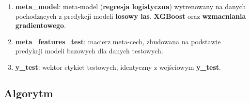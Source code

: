 \begin{enumerate}
	\def\labelenumi{\arabic{enumi}.}
	\item
	      \textbf{meta\_model}: meta-model (\textbf{regresja logistyczna}) wytrenowany na danych pochodzących z predykcji modeli \textbf{losowy las}, \textbf{XGBoost} oraz \textbf{wzmacniania gradientowego}.
	\item
	      \textbf{meta\_features\_test}: macierz meta-cech, zbudowana na podstawie predykcji modeli bazowych dla danych testowych.
	\item
	      \textbf{y\_test}: wektor etykiet testowych, identyczny z wejściowym \textbf{y\_test}.
\end{enumerate}

\subsection{Algorytm}
